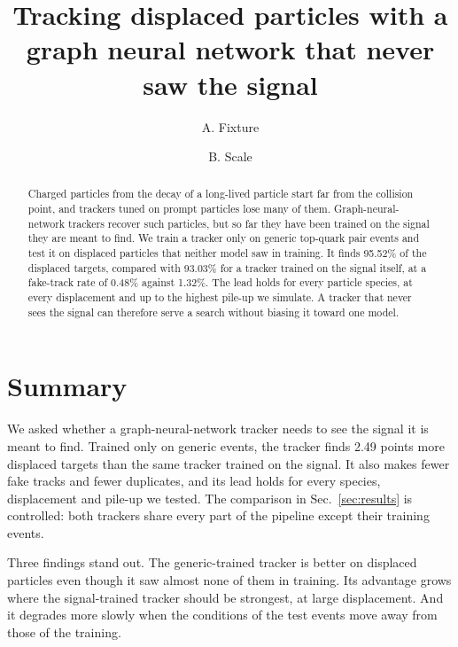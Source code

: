 \documentclass[aps,prd,preprint,superscriptaddress,nofootinbib]{revtex4-2}
\begin{document}
\title{Tracking displaced particles with a graph neural network that never saw the signal}
\author{A. Fixture}
\author{B. Scale}

\begin{abstract}
Charged particles from the decay of a long-lived particle start far from the collision point, and trackers tuned on prompt particles lose many of them.
Graph-neural-network trackers recover such particles, but so far they have been trained on the signal they are meant to find.
We train a tracker only on generic top-quark pair events and test it on displaced particles that neither model saw in training.
It finds 95.52\% of the displaced targets, compared with 93.03\% for a tracker trained on the signal itself, at a fake-track rate of 0.48\% against 1.32\%.
The lead holds for every particle species, at every displacement and up to the highest pile-up we simulate.
A tracker that never sees the signal can therefore serve a search without biasing it toward one model.
\end{abstract}

\maketitle





\section{Summary}
\label{sec:summary}

We asked whether a graph-neural-network tracker needs to see the signal it is meant to find.
Trained only on generic events, the tracker finds 2.49 points more displaced targets than the same tracker trained on the signal.
It also makes fewer fake tracks and fewer duplicates, and its lead holds for every species, displacement and pile-up we tested.
The comparison in Sec.~\ref{sec:results} is controlled: both trackers share every part of the pipeline except their training events.

Three findings stand out.
The generic-trained tracker is better on displaced particles even though it saw almost none of them in training.
Its advantage grows where the signal-trained tracker should be strongest, at large displacement.
And it degrades more slowly when the conditions of the test events move away from those of the training.
\end{document}
